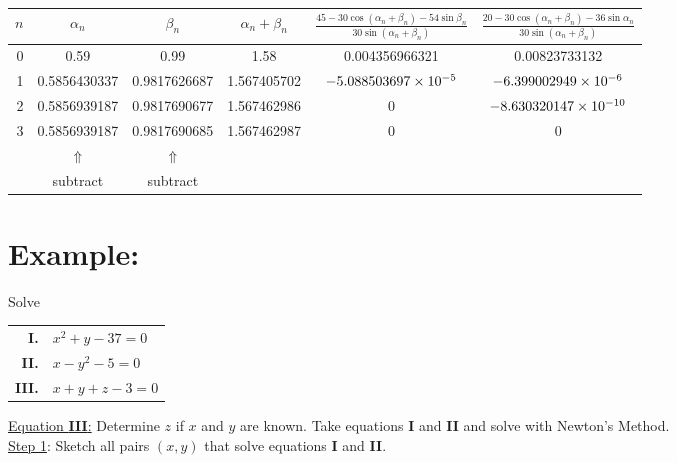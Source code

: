 \documentclass[a4paper,12pt]{report}
\begin{document}
\begin{center}
	\begin{tabular}{r|c|c|c|c|c}
	$n$ & $\alpha_n$ & $\beta_n$ & $\alpha_n + \beta_n$ &
	$\frac{45 - 30\cos(\alpha_n+\beta_n) - 54\sin\beta_n}{30 \sin(\alpha_n+\beta_n)}$ &
	$\frac{20 - 30\cos(\alpha_n+\beta_n) - 36\sin\alpha_n}{30 \sin(\alpha_n+\beta_n)}$\\
	\hline
	0 & \footnotesize 0.59 & \footnotesize 0.99 & \footnotesize 1.58 & \footnotesize 0.004356966321 &
	\footnotesize 0.00823733132 \\
	1 & \footnotesize 0.5856430337 & \footnotesize 0.9817626687 & \footnotesize 1.567405702 &
	$ \footnotesize -5.088503697\times 10^{-5}$ & $ \footnotesize -6.399002949 \times 10^{-6}$ \\
	2 & \footnotesize 0.5856939187 & \footnotesize 0.9817690677 &\footnotesize 1.567462986 & \footnotesize 0 &
	$\footnotesize -8.630320147 \times 10^{-10}$ \\
	3 & \footnotesize 0.5856939187 & \footnotesize 0.9817690685 & \footnotesize 1.567462987 & \footnotesize 0 &
	 \footnotesize 0 \\
	& $\Uparrow$ & $\Uparrow$ &&& \\
	& subtract & subtract &&&
	\end{tabular}
	\end{center}
	
	\bigskip
	
	\section{Example:}
	\noindent Solve
	\begin{center}
	\begin{tabular}{rl}
		\textbf{I.} & $x^2 + y - 37 = 0$\\
		\textbf{II.} & $x-y^2 - 5 = 0$\\
		\textbf{III.}& $x + y + z - 3 = 0$
	\end{tabular}
	\end{center}
	
	\noindent \underline{Equation \textbf{III}:} Determine $z$ if $x$ and $y$ are known.  Take equations \textbf{I} 
	and \textbf{II} and solve with Newton's Method.\\
	
	\noindent \underline{Step 1}: Sketch all pairs $(x,y)$ that solve equations \textbf{I} and \textbf{II}.
	
\end{document}

